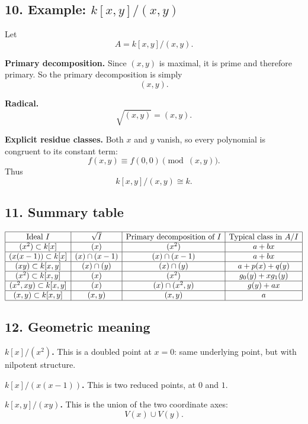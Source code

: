 \documentclass[12pt,a4paper]{article}
\theoremstyle{notespace}
\begin{document}
\subsection{10. Example: \(k[x,y]/(x,y)\)}

Let
\[
A=k[x,y]/(x,y).
\]

\textbf{Primary decomposition.}
Since \((x,y)\) is maximal, it is prime and therefore primary.
So the primary decomposition is simply
\[
(x,y).
\]

\textbf{Radical.}
\[
\sqrt{(x,y)}=(x,y).
\]

\textbf{Explicit residue classes.}
Both \(x\) and \(y\) vanish, so every polynomial is congruent to its constant term:
\[
f(x,y)\equiv f(0,0)\pmod{(x,y)}.
\]
Thus
\[
k[x,y]/(x,y)\cong k.
\]

\subsection{11. Summary table}

\[
\begin{array}{|c|c|c|c|}
	\hline
	\text{Ideal }I & \sqrt I & \text{Primary decomposition of }I & \text{Typical class in }A/I \\
	\hline
	(x^2)\subset k[x] & (x) & (x^2) & a+bx \\
	\hline
	(x(x-1))\subset k[x] & (x)\cap(x-1) & (x)\cap(x-1) & a+bx \\
	\hline
	(xy)\subset k[x,y] & (x)\cap(y) & (x)\cap(y) & a+p(x)+q(y) \\
	\hline
	(x^2)\subset k[x,y] & (x) & (x^2) & g_0(y)+xg_1(y) \\
	\hline
	(x^2,xy)\subset k[x,y] & (x) & (x)\cap(x^2,y) & g(y)+ax \\
	\hline
	(x,y)\subset k[x,y] & (x,y) & (x,y) & a \\
	\hline
\end{array}
\]

\subsection{12. Geometric meaning}

\textbf{\(k[x]/(x^2)\).}
This is a doubled point at \(x=0\): same underlying point, but with nilpotent structure.

\textbf{\(k[x]/(x(x-1))\).}
This is two reduced points, at \(0\) and \(1\).

\textbf{\(k[x,y]/(xy)\).}
This is the union of the two coordinate axes:
\[
V(x)\cup V(y).
\]
\end{document}
